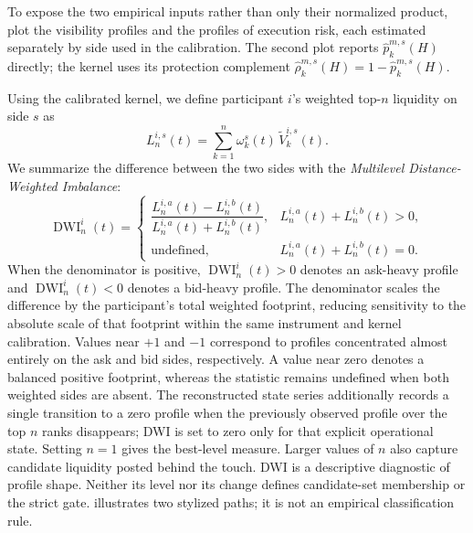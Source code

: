 \documentclass[11pt]{article}
\newenvironment{review}{\begingroup\color{blue}}{\endgroup}
\begin{document}
To expose the two empirical inputs rather than only their normalized product,
 plot \begin{review}the visibility profiles and the profiles of execution risk, each estimated separately by side\end{review} used in the calibration. The second plot reports
$\widehat p^{m,s}_{k}(H)$ directly; the
kernel uses its protection complement $\widehat\rho^{m,s}_{k}(H)=1-\widehat p^{m,s}_{k}(H)$.


\FloatBarrier

Using the calibrated kernel, we define participant $i$'s weighted top-$n$ liquidity on side $s$ as
\begin{equation}
    L^{i,s}_{n}(t)
    =
    \sum_{k=1}^{n}
    \omega^{s}_{k}(t)\,\widetilde V^{i,s}_{k}(t).
    \label{eq:weighted_topn_liquidity}
\end{equation}
We summarize the difference between the two sides with the \textit{Multilevel Distance-Weighted Imbalance}:
\begin{equation}
    \operatorname{DWI}^{i}_{n}(t)
    =\begin{cases}
    \dfrac{
        L^{i,a}_{n}(t)-L^{i,b}_{n}(t)
    }{
        L^{i,a}_{n}(t)+L^{i,b}_{n}(t)
    },
    & L^{i,a}_{n}(t)+L^{i,b}_{n}(t)>0,\\
    \text{undefined},
    & L^{i,a}_{n}(t)+L^{i,b}_{n}(t)=0.
    \end{cases}
    \label{eq:multilevel_dwi}
\end{equation}
When the denominator is positive, $\operatorname{DWI}^{i}_{n}(t)>0$ denotes an ask-heavy profile and
$\operatorname{DWI}^{i}_{n}(t)<0$ denotes a bid-heavy profile. The denominator scales the difference by the participant's
total weighted footprint, reducing sensitivity to the absolute scale of that footprint within the same instrument and
kernel calibration. Values near $+1$ and $-1$ correspond to profiles concentrated almost entirely on the ask and bid sides,
respectively. A value near zero denotes a balanced positive footprint, whereas the statistic remains undefined when both
weighted sides are absent. The reconstructed state series additionally records \begin{review}a single transition to a zero profile when the previously observed profile over the top $n$ ranks disappears\end{review}; DWI is set to zero only for that explicit operational state. Setting $n=1$
gives the best-level measure. Larger values of $n$ also capture candidate liquidity posted behind the touch. DWI is \begin{review}a descriptive diagnostic of profile shape\end{review}. Neither its level nor its change defines candidate-set membership or the strict gate.
 illustrates two stylized paths; it is not an empirical classification rule.
\end{document}

